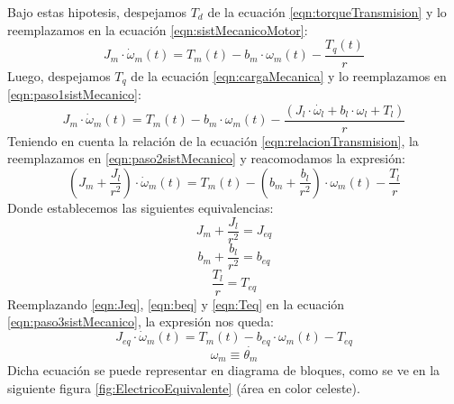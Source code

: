 \documentclass[10pt]{article}
\begin{document}
\begin{itemize}
	Bajo estas hipotesis, despejamos $T_{d}$ de la ecuación \ref{eqn:torqueTransmision} y lo reemplazamos en la ecuación \ref{eqn:sistMecanicoMotor}:
	\begin{equation}
		\label{eqn:paso1sistMecanico}
		J_{m}\cdot \dot{\omega }_{m}\left ( t \right )=T_{m}\left ( t \right )-b_{m}\cdot \omega_{m}\left ( t \right )-\frac{T_{q}\left ( t \right )}{r}
	\end{equation}
	Luego, despejamos $T_{q}$ de la ecuación \ref{eqn:cargaMecanica} y lo reemplazamos en \ref{eqn:paso1sistMecanico}:
	\begin{equation}
		\label{eqn:paso2sistMecanico}
		J_{m}\cdot \dot{\omega }_{m}\left ( t \right )=T_{m}\left ( t \right )-b_{m}\cdot \omega_{m}\left ( t \right )-\frac{\left ( J_{l}\cdot \dot{\omega_{l}}+b_{l}\cdot \omega_{l}+T_{l} \right )}{r}
	\end{equation}
	Teniendo en cuenta la relación de la ecuación \ref{eqn:relacionTransmision}, la reemplazamos en \ref{eqn:paso2sistMecanico} y reacomodamos la expresión:
	\begin{equation}
		\label{eqn:paso3sistMecanico}
		\left ( J_{m}+\frac{J_{l}}{r^{2}} \right )\cdot \dot{\omega }_{m}\left ( t \right )=T_{m}\left ( t \right )-\left ( b_{m}+\frac{b_{l}}{r^{2}} \right )\cdot \omega_{m}\left ( t \right )-\frac{T_{l}}{r}
	\end{equation}
	Donde establecemos las siguientes equivalencias:
	\begin{equation}
		\label{eqn:Jeq}
		J_{m}+\frac{J_{l}}{r^{2}}=J_{eq}
	\end{equation}
	\begin{equation}
		\label{eqn:beq}
		b_{m}+\frac{b_{l}}{r^{2}}=b_{eq}
	\end{equation}
	\begin{equation}
		\label{eqn:Teq}
		\frac{T_{l}}{r}=T_{eq}
	\end{equation}
	Reemplazando \ref{eqn:Jeq}, \ref{eqn:beq} y \ref{eqn:Teq} en la ecuación \ref{eqn:paso3sistMecanico}, la expresión nos queda:
	\begin{equation}
		\label{sist:mecanico}
		J_{eq}\cdot \dot{\omega }_{m}\left ( t \right )=T_{m}\left ( t \right )-b_{eq}\cdot \omega_{m}\left ( t \right )-T_{eq}
	\end{equation}
	\begin{equation}
		\label{globalNL:omegaM}
		\omega_{m} \equiv \dot{\theta_{m}}
	\end{equation}
	Dicha ecuación se puede representar en diagrama de bloques, como se ve en la siguiente figura \ref{fig:ElectricoEquivalente} (área en color celeste).

\end{itemize}
\end{document}

